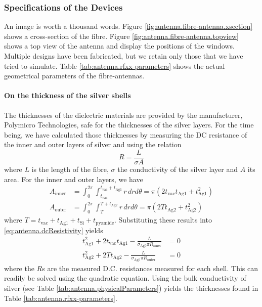 \subsubsection{Specifications of the Devices}
An image is worth a thousand words. Figure \ref{fig:antenna.fibre-antenna.xsection}
shows a cross-section of the fibre. Figure \ref{fig:antenna.fibre-antenna.topview} 
shows a top view of the antenna and display the positions of the windows. 
Multiple designs have been fabricated, but we retain only those that 
we have tried to simulate. Table \ref{tab:antenna.rfxx-parameters} 
shows the actual geometrical parameters of the fibre-antennas.

\paragraph*{On the thickness of the silver shells}
The thicknesses of the dielectric materials are provided by the manufacturer, 
Polymicro Technologies, safe for the thicknesses of the silver layers. 
For the time being, we have calculated those thicknesses by measuring
the DC resistance of the inner and outer layers of silver and
using the relation \cite[p.~204]{CHE1989}
  \begin{equation}
    \label{eq:antenna.dcResistivity}
    R = \frac{L}{\sigma A}
  \end{equation}
where $L$ is the length of the fibre, $\sigma$ the conductivity of the silver
layer and $A$ its area. For the inner and outer layers, we have
  \begin{align}
    A_\text{inner}	&= \int_0^{2\pi}\int_{t_\text{vac}}^{t_\text{vac}+t_\text{Ag1}}r\,dr d\theta= \pi\left(2t_\text{vac}t_\text{Ag1}+t_\text{Ag1}^2\right)	\\
    A_\text{outer}	&= \int_0^{2\pi}\int_T^{T+t_\text{Ag2}}r\,dr d\theta = \pi\left(2Tt_\text{Ag2}+t_\text{Ag2}^2\right)
  \end{align}
where $T=t_\text{vac}+t_\text{Ag1}+t_\text{Si}+t_\text{pyamide}$. 
Substituting these results into \eqref{eq:antenna.dcResistivity}
yields
  \begin{subequations}
  \label{eq:antenna:thickGeneralEquations}
  \begin{align}  
   t_\text{Ag1}^2 + 2t_\text{vac}t_\text{Ag1}-\frac{L}{\sigma_\text{Ag0}\pi R_\text{inner}}	&=0	\\
   t_\text{Ag2}^2 + 2Tt_\text{Ag2}-\frac{L}{\sigma_\text{Ag0}\pi R_\text{outer}}			&=0
  \end{align}
  \end{subequations}
where the $R$s are the measured D.C. resistances measured for each shell. 
This can readily be solved using the quadratic equation. Using the bulk conductivity
of silver (see Table \ref{tab:antenna.physicalParameters}) yields the 
thicknesses found in Table \ref{tab:antenna.rfxx-parameters}.

